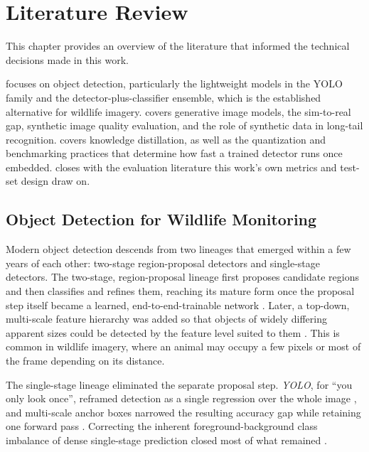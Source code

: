 \newpage
\cleardoublepage
\chapter{Literature Review}\label{chapter:literature_review}

This chapter provides an overview of the literature that informed the technical decisions made in this work.

 focuses on object detection, particularly the lightweight models in the YOLO family and the detector-plus-classifier ensemble, which is the established alternative for wildlife imagery.  covers generative image models, the sim-to-real gap, synthetic image quality evaluation, and the role of synthetic data in long-tail recognition.  covers knowledge distillation, as well as the quantization and benchmarking practices that determine how fast a trained detector runs once embedded.  closes with the evaluation literature this work's own metrics and test-set design draw on.

\section{Object Detection for Wildlife Monitoring}\label{sec:lit_object_detection}

Modern object detection descends from two lineages that emerged within a few years of each other: two-stage region-proposal detectors and single-stage detectors. The two-stage, region-proposal lineage first proposes candidate regions and then classifies and refines them, reaching its mature form once the proposal step itself became a learned, end-to-end-trainable network \cite{girshickRichFeatureHierarchies2014a,renFasterRCNNRealTime2017}. Later, a top-down, multi-scale feature hierarchy was added so that objects of widely differing apparent sizes could be detected by the feature level suited to them \cite{linFeaturePyramidNetworks2017}. This is common in wildlife imagery, where an animal may occupy a few pixels or most of the frame depending on its distance.

The single-stage lineage eliminated the separate proposal step. \textit{YOLO}, for \enquote{you only look once}, reframed detection as a single regression over the whole image \cite{redmonYouOnlyLook2016a}, and multi-scale anchor boxes narrowed the resulting accuracy gap while retaining one forward pass \cite{liuSSDSingleShot2016a}. Correcting the inherent foreground-background class imbalance of dense single-stage prediction closed most of what remained \cite{linFocalLossDense2017}.

